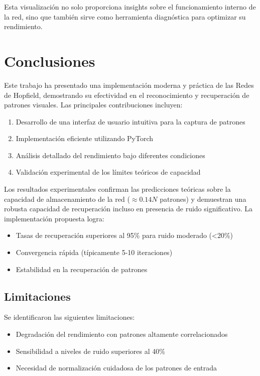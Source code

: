 \documentclass{article}
\begin{document}
Esta visualización no solo proporciona insights sobre el funcionamiento interno de la red, sino que también sirve como herramienta diagnóstica para optimizar su rendimiento.

\section{Conclusiones}
Este trabajo ha presentado una implementación moderna y práctica de las Redes de Hopfield, demostrando su efectividad en el reconocimiento y recuperación de patrones visuales. Las principales contribuciones incluyen:

\begin{enumerate}
    \item Desarrollo de una interfaz de usuario intuitiva para la captura de patrones
    \item Implementación eficiente utilizando PyTorch
    \item Análisis detallado del rendimiento bajo diferentes condiciones
    \item Validación experimental de los límites teóricos de capacidad
\end{enumerate}

Los resultados experimentales confirman las predicciones teóricas sobre la capacidad de almacenamiento de la red (\(\approx 0.14N\) patrones) y demuestran una robusta capacidad de recuperación incluso en presencia de ruido significativo. La implementación propuesta logra:

\begin{itemize}
    \item Tasas de recuperación superiores al 95\% para ruido moderado (<20\%)
    \item Convergencia rápida (típicamente 5-10 iteraciones)
    \item Estabilidad en la recuperación de patrones
\end{itemize}

\subsection{Limitaciones}
Se identificaron las siguientes limitaciones:
\begin{itemize}
    \item Degradación del rendimiento con patrones altamente correlacionados
    \item Sensibilidad a niveles de ruido superiores al 40\%
    \item Necesidad de normalización cuidadosa de los patrones de entrada
\end{itemize}
\end{document}

